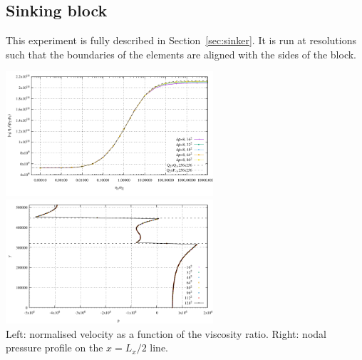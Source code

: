 \newpage
\subsection*{Sinking block}

This experiment is fully described in Section~\ref{sec:sinker}.
It is run at resolutions such that the boundaries of the elements are aligned with the sides of the block.

\begin{center}
\includegraphics[width=7.7cm]{python_codes/fieldstone_80/results/block/results_v}
\includegraphics[width=7.7cm]{python_codes/fieldstone_80/results/block/pline}\\
{\captionfont Left: normalised velocity as a function of the viscosity ratio. Right: 
nodal pressure profile on the $x=L_x/2$ line.}
\end{center}


